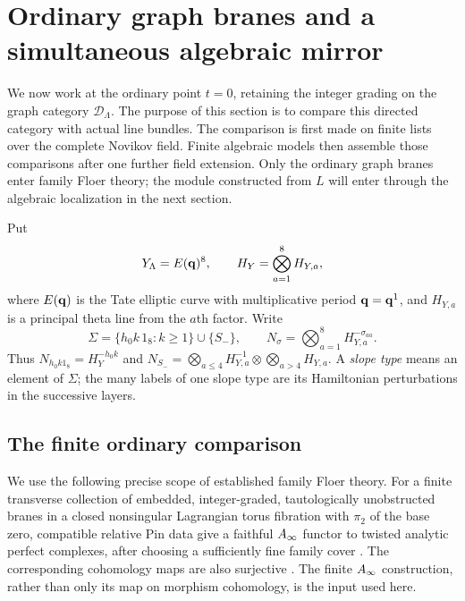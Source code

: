 \section{Ordinary graph branes and a simultaneous algebraic mirror}
\label{mirror:section}

We now work at the ordinary point $t=0$, retaining the integer grading
on the graph category $\mathcal D_\Lambda$.  The purpose of this section
is to compare this directed category with actual line bundles.  The
comparison is first made on finite lists over the complete Novikov
field.  Finite algebraic models then assemble those comparisons after
one further field extension.  Only the ordinary graph branes enter
family Floer theory; the module constructed from $L$ will enter through
the algebraic localization in the next section.

Put
\[
 Y_\Lambda=E(\mathbf q)^8,\qquad
 H_Y=\bigotimes_{a=1}^8 H_{Y,a},
\]
where $E(\mathbf q)$ is the Tate elliptic curve with multiplicative period
$\mathbf q=\mathbf q^1$, and $H_{Y,a}$ is a principal theta line from the $a$th
factor.  Write
\[
 \Sigma=\{h_0k\,1_8:k\geq1\}\cup\{S_-\},\qquad
 N_\sigma=\bigotimes_{a=1}^8H_{Y,a}^{-\sigma_{aa}}.
\]
Thus $N_{h_0k1_8}=H_Y^{-h_0k}$ and
$N_{S_-}=\bigotimes_{a\leq4}H_{Y,a}^{-1}
\otimes\bigotimes_{a>4}H_{Y,a}$.  A \emph{slope type} means an element
of $\Sigma$; the many labels of one slope type are its Hamiltonian
perturbations in the successive layers.

\subsection{The finite ordinary comparison}

We use the following precise scope of established family Floer theory.
For a finite transverse collection of embedded, integer-graded,
tautologically unobstructed branes in a closed nonsingular Lagrangian
torus fibration with $\pi_2$ of the base zero, compatible relative
Pin data give a faithful $A_\infty$ functor to twisted analytic perfect
complexes, after choosing a sufficiently fine family cover
\cite[Theorem~2.10, \S2.4.1, and Appendix~A]{abouzaid-faithful}.
The corresponding cohomology maps are also surjective
\cite[Theorem~1.1 and Corollary~1.2]{abouzaid-hms}.  The finite
$A_\infty$ construction, rather than only its map on morphism cohomology,
is the input used here.


